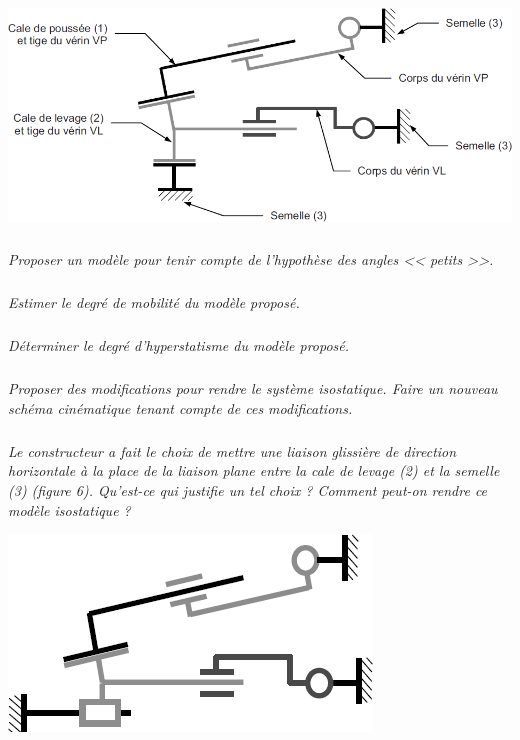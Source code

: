 \documentclass[10pt,fleqn]{article} %
\begin{document}
\begin{multicols}{2}
\begin{center}
\includegraphics[width=\linewidth]{images/viaduc_03.png}
\end{center}

\subparagraph{}
\textit{Proposer un modèle pour tenir compte de l'hypothèse des angles << petits >>.}
\ifprof
\begin{corrige}
\end{corrige}\else\fi

\subparagraph{}
\textit{Estimer le degré de mobilité du modèle proposé.}
\ifprof
\begin{corrige}
\end{corrige}\else\fi


\subparagraph{}
\textit{Déterminer le degré d’hyperstatisme du modèle proposé.}
\ifprof
\begin{corrige}
\end{corrige}\else\fi


\subparagraph{}
\textit{Proposer des modifications pour rendre le système isostatique. Faire un
nouveau schéma cinématique tenant compte de ces modifications.}
\ifprof
\begin{corrige}
\end{corrige}\else\fi


\subparagraph{}
\textit{Le constructeur a fait le choix de mettre
une liaison glissière de direction horizontale à la place de
la liaison plane entre la cale de levage (2) et la semelle (3)
(figure 6). Qu’est-ce qui justifie un tel choix ? Comment
peut-on rendre ce modèle isostatique ?}
\ifprof
\begin{corrige}
\end{corrige}\else\fi

\begin{center}
\includegraphics[width=.8\linewidth]{images/viaduc_04.png}
\end{center}


\end{multicols}
\end{document}
